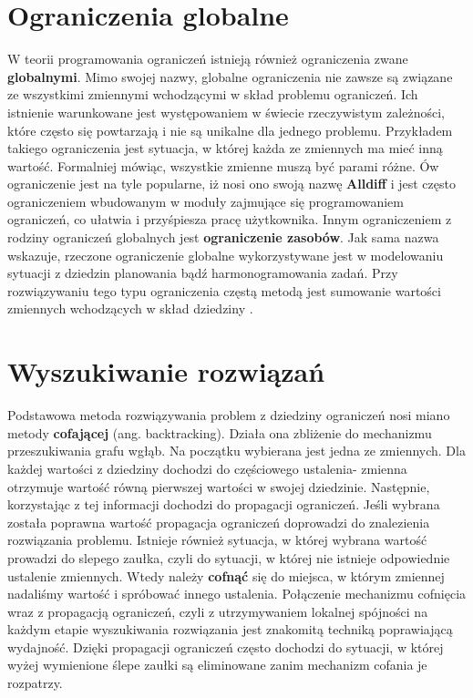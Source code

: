 \section{Ograniczenia globalne}
    W teorii programowania ograniczeń istnieją również ograniczenia zwane \textbf{globalnymi}. Mimo swojej nazwy, 
    globalne ograniczenia nie zawsze są związane ze wszystkimi zmiennymi wchodzącymi w skład problemu ograniczeń. 
    Ich istnienie warunkowane jest występowaniem w świecie rzeczywistym zależności, które często się powtarzają i nie są 
    unikalne dla jednego problemu. Przykładem takiego ograniczenia jest sytuacja, w której każda ze zmiennych ma mieć inną wartość.
    Formalniej mówiąc, wszystkie zmienne muszą być parami różne. Ów ograniczenie jest na tyle popularne, iż nosi ono swoją nazwę 
    \textbf{Alldiff} i jest często ograniczeniem wbudowanym w moduły zajmujące się programowaniem ograniczeń, co ułatwia i przyśpiesza 
    pracę użytkownika. Innym ograniczeniem z rodziny ograniczeń globalnych jest \textbf{ograniczenie zasobów}. Jak sama nazwa wskazuje, 
    rzeczone ograniczenie globalne wykorzystywane jest w modelowaniu sytuacji z dziedzin planowania bądź harmonogramowania zadań. 
    Przy rozwiązywaniu tego typu ograniczenia częstą metodą jest sumowanie wartości zmiennych wchodzących w skład dziedziny \cite{AI}.
    
    
\section{Wyszukiwanie rozwiązań}
    Podstawowa metoda rozwiązywania problem z dziedziny ograniczeń nosi miano metody \textbf{cofającej} (ang. backtracking).
    Działa ona zbliżenie do mechanizmu przeszukiwania grafu wgłąb. Na początku wybierana jest jedna ze zmiennych. Dla każdej wartości 
    z dziedziny dochodzi do częściowego ustalenia- zmienna otrzymuje wartość równą pierwszej wartości w swojej dziedzinie. Następnie, 
    korzystając z tej informacji dochodzi do propagacji ograniczeń. Jeśli wybrana została poprawna wartość propagacja ograniczeń doprowadzi 
    do znalezienia rozwiązania problemu. Istnieje również sytuacja, w której wybrana wartość prowadzi do slepego zaułka, czyli do sytuacji, w której 
    nie istnieje odpowiednie ustalenie zmiennych. Wtedy należy \textbf{cofnąć} 
    się do miejsca, w którym zmiennej nadaliśmy wartość i spróbować innego ustalenia. 
    Połączenie mechanizmu cofnięcia wraz z propagacją ograniczeń, czyli z utrzymywaniem lokalnej spójności na każdym etapie 
    wyszukiwania rozwiązania jest znakomitą techniką poprawiającą wydajność. Dzięki propagacji ograniczeń często 
    dochodzi do sytuacji, w której wyżej wymienione ślepe zaułki są eliminowane zanim mechanizm cofania je rozpatrzy. 
    
